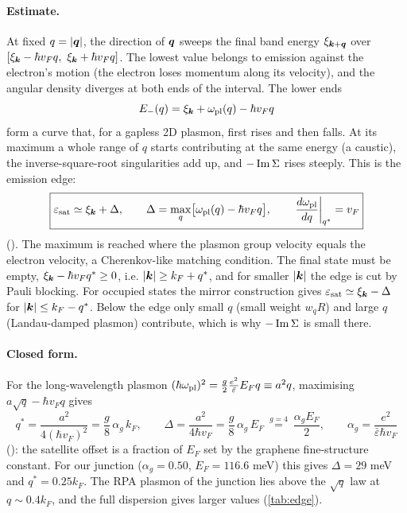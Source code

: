 \paragraph{Estimate.} At fixed $q=|\bm q|$, the direction of $\bm q$ sweeps the final band energy
$\xi_{\bm k+\bm q}$ over $[\xi_{\bm k}-\hbar v_Fq,\ \xi_{\bm k}+\hbar v_Fq]$. The lowest value belongs to emission against the
electron's motion (the electron loses momentum along its velocity), and the angular density diverges at both
ends of the interval. The lower ends
\begin{equation}
E_-(q)=\xi_{\bm k}+\omega_{\rm pl}(q)-\hbar v_Fq
\end{equation}
form a curve that, for a gapless 2D plasmon, first rises and then falls. At its maximum a whole range of $q$
starts contributing at the same energy (a caustic), the inverse-square-root singularities add up, and
$-\operatorname{Im}\Sigma$ rises steeply. This is the emission edge:
\begin{equation}
\boxed{\varepsilon_{\rm sat}\simeq\xi_{\bm k}+\Delta,\qquad \Delta=\max_q\bigl[\omega_{\rm pl}(q)-\hbar v_Fq\bigr],\qquad
\left.\frac{d\omega_{\rm pl}}{dq}\right|_{q^*}=v_F}
\label{eq:edge}
\end{equation}
(). The maximum is reached where the plasmon group velocity equals the electron
velocity, a Cherenkov-like matching condition. The final state must be empty, $\xi_{\bm k}-\hbar v_Fq^*\ge0$, i.e.
$|\bm k|\ge k_F+q^*$, and for smaller $|\bm k|$ the edge is cut by Pauli blocking. For occupied states the mirror construction
gives $\varepsilon_{\rm sat}\simeq\xi_{\bm k}-\Delta$ for $|\bm k|\le k_F-q^*$. Below the edge only small $q$ (small weight $w_qR$)
and large $q$ (Landau-damped plasmon) contribute, which is why $-\operatorname{Im}\Sigma$ is small there.

\paragraph{Closed form.} For the long-wavelength plasmon $(\hbar\omega_{\rm pl})^2=\frac g2\frac{e^2}{\bar\varepsilon}E_Fq\equiv a^2q$,
maximising $a\sqrt q-\hbar v_Fq$ gives
\begin{equation}
q^*=\frac{a^2}{4(\hbar v_F)^2}=\frac g8\,\alpha_g\,k_F,\qquad
\Delta=\frac{a^2}{4\hbar v_F}=\frac g8\,\alpha_g\,E_F\ \stackrel{g=4}{=}\ \frac{\alpha_gE_F}{2},\qquad
\alpha_g=\frac{e^2}{\bar\varepsilon\hbar v_F}
\label{eq:edgeclosed}
\end{equation}
(): the satellite offset is a fraction of $E_F$ set by the graphene
fine-structure constant. For our junction ($\alpha_g=0.50$, $E_F=116.6$ meV) this gives $\Delta=29$ meV and
$q^*=0.25k_F$. The RPA plasmon of the junction lies above the $\sqrt q$ law at $q\sim0.4k_F$, and the full
dispersion gives larger values (\cref{tab:edge}).

